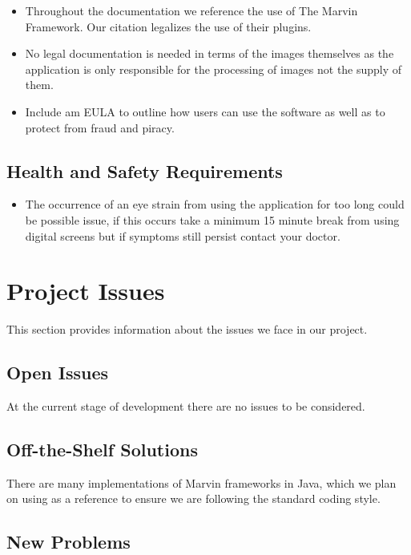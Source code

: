 \documentclass[12pt, titlepage]{article}
\begin{document}
\begin{itemize}
\item Throughout the documentation we reference the use of The Marvin Framework. Our citation legalizes the use of their plugins.
\item No legal documentation is needed in terms of the images themselves as the application is only responsible for the processing of images not the supply of them.
\item Include am EULA to outline how users can use the software as well as to protect from fraud and piracy.
\end{itemize}

\subsection{Health and Safety Requirements}
\begin{itemize}
	\item  The occurrence of an eye strain from using the application for too long could be possible issue, if this occurs take a minimum 15 minute break from using digital screens but if symptoms still persist contact your doctor.
\end{itemize}


\newpage

\section{Project Issues}

This section provides information about the issues we face in our project.

\subsection{Open Issues}
At the current stage of development there are no issues to be considered.

\subsection{Off-the-Shelf Solutions}

There are many implementations of Marvin frameworks in Java, which we plan on using as a reference to ensure we are following the standard coding style.

\subsection{New Problems}
\end{document}
